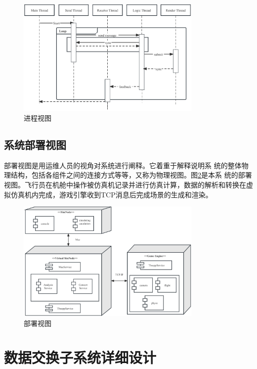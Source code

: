 \begin{figure}[h]
    \begin{center}
        \includegraphics[width=0.8\textwidth]{pictures/procedure.pdf}
        \caption{进程视图}
        \label{procedure}
    \end{center} 
\end{figure}
\subsection{系统部署视图}
部署视图是用运维人员的视角对系统进行阐释。它着重于解释说明系
统的整体物理结构，包括各组件之间的连接方式等等，又称为物理视图。图\ref{deploydiagram}是本系
统的部署视图。飞行员在机舱中操作被仿真机记录并进行仿真计算，数据的解析和转换在虚拟仿真机内完成，游戏引擎收到TCP消息后完成场景的生成和渲染。
\begin{figure}[h]
    \begin{center}
        \includegraphics[width=0.8\textwidth]{pictures/deploydiagram.pdf}
        \caption{部署视图}
        \label{deploydiagram}
    \end{center}
\end{figure}
\section{数据交换子系统详细设计}

